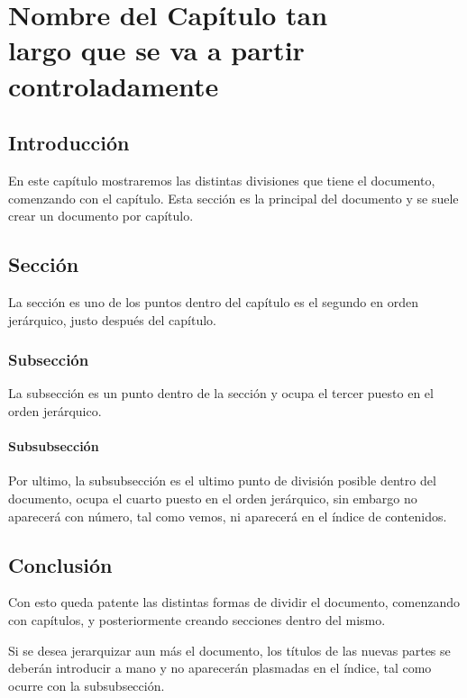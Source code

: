 
\chapter{Nombre del Capítulo tan \\largo que se va a partir controladamente }

\thispagestyle{plain}
\renewcommand{\tablename}{Tabla}

\section{Introducción}

En este capítulo mostraremos las distintas divisiones que tiene el documento, comenzando con el capítulo. Esta sección es la principal del documento y se suele crear un documento por capítulo.

\section{Sección}

La sección es uno de los puntos dentro del capítulo es el segundo en orden jerárquico, justo después del capítulo.
\clearpage

\subsection{Subsección}

La subsección es un punto dentro de la sección y ocupa el tercer puesto en el orden jerárquico.

\subsubsection{Subsubsección}

Por ultimo, la subsubsección es el ultimo punto de división posible dentro del documento, ocupa el cuarto puesto en el orden jerárquico, sin embargo no aparecerá con número, tal como vemos, ni aparecerá en el índice de contenidos.
\clearpage

\section{Conclusión}

Con esto queda patente las distintas formas de dividir el documento, comenzando con capítulos, y posteriormente creando secciones dentro del mismo.

Si se desea jerarquizar aun más el documento, los títulos de las nuevas partes se deberán introducir a mano y no aparecerán plasmadas en el índice, tal como ocurre con la subsubsección.

\blankpage